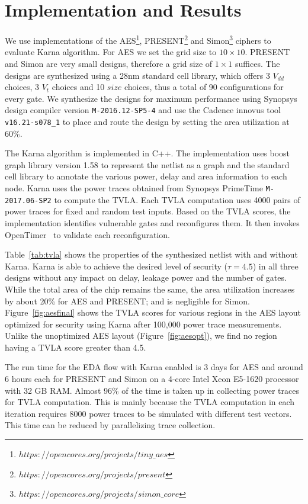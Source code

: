 \section{Implementation and Results}
\label{sec:experiment}
We use implementations of the AES\footnote{$https://opencores.org/projects/tiny\_aes$}, PRESENT\footnote{$https://opencores.org/projects/present$} and Simon\footnote{$https://opencores.org/projects/simon\_core$} ciphers to evaluate {\sf Karna} algorithm. For AES we set the grid size to $10\times 10$. PRESENT and Simon are very small designs, therefore a grid size of $1\times 1$ suffices.
The designs are synthesized using a 28nm standard cell library, which offers 3 $V_{dd}$ choices, 3 $V_t$ choices and 10 $size$ choices, thus a total of 90 configurations for every gate. We synthesize the designs for maximum performance using Synopsys design compiler version \texttt{M-2016.12-SP5-4} and use the Cadence innovus tool \texttt{v16.21-s078\_1} to place and route the design by setting the area utilization at 60\%. 

 The {\sf Karna} algorithm is implemented in C++. The implementation uses boost graph library version 1.58 to represent the netlist as a graph and the standard cell library to annotate the various power, delay and area information to each node. {\sf Karna} uses the power traces obtained from Synopsys PrimeTime \texttt{M-2017.06-SP2} to compute the TVLA. Each TVLA computation uses 4000 pairs of power traces for fixed and random test inputs. Based on the TVLA scores, the implementation identifies vulnerable gates and reconfigures them. It then invokes OpenTimer~\cite{Opentimer} to validate each reconfiguration.

 Table~\ref{tab:tvla} shows the properties of the synthesized netlist with and without {\sf Karna}. {\sf Karna} is able to achieve the desired level of security ($\tau=4.5$) in all three designs without any impact on delay, leakage power and the number of gates. While the total area of the chip remains the same, the area utilization increases by about 20\% for AES and PRESENT; and is negligible  for Simon. Figure~\ref{fig:aesfinal} shows the TVLA scores for various regions in the AES layout optimized for security using  {\sf Karna} after 100,000 power trace measurements.  Unlike the unoptimized AES layout (Figure~\ref{fig:aesopt}), we find no region having a TVLA score greater than 4.5.
 
The run time for the EDA flow with {\sf Karna} enabled is 3 days for AES and around 6 hours each for PRESENT and Simon on a 4-core Intel Xeon E5-1620 processor with 32 GB RAM. Almost 96\% of the time is taken up in collecting power traces for TVLA computation.
This is mainly because the TVLA computation in each iteration requires 8000 power traces to be simulated with different test vectors. This time  can be reduced by parallelizing trace collection.



